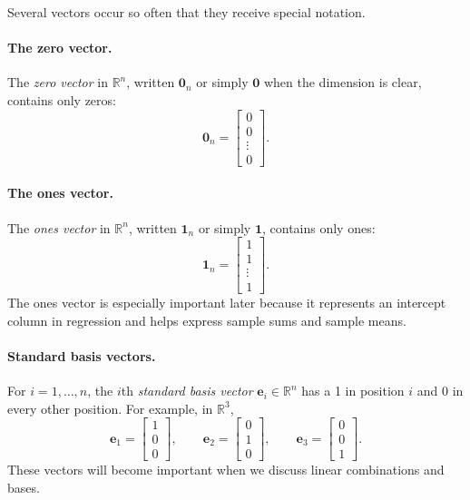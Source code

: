 Several vectors occur so often that they receive special notation.

\paragraph{The zero vector.}
\label{mf:zero-vector}
The \emph{zero vector} in \(\mathbb{R}^n\), written \(\mathbf{0}_n\) or simply \(\mathbf{0}\) when the dimension is clear, contains only zeros:
\[
\mathbf{0}_n=
\begin{bmatrix}
0\\0\\\vdots\\0
\end{bmatrix}.
\]

\paragraph{The ones vector.}
\label{mf:ones-vector}
The \emph{ones vector} in \(\mathbb{R}^n\), written \(\mathbf{1}_n\) or simply \(\mathbf{1}\), contains only ones:
\[
\mathbf{1}_n=
\begin{bmatrix}
1\\1\\\vdots\\1
\end{bmatrix}.
\]
The ones vector is especially important later because it represents an intercept column in regression and helps express sample sums and sample means.

\paragraph{Standard basis vectors.}
\label{mf:standard-basis-vectors}
For \(i=1,\ldots,n\), the \(i\)th \emph{standard basis vector} \(\mathbf{e}_i\in\mathbb{R}^n\) has a 1 in position \(i\) and 0 in every other position. For example, in \(\mathbb{R}^3\),
\[
\mathbf{e}_1=\begin{bmatrix}1\\0\\0\end{bmatrix},
\qquad
\mathbf{e}_2=\begin{bmatrix}0\\1\\0\end{bmatrix},
\qquad
\mathbf{e}_3=\begin{bmatrix}0\\0\\1\end{bmatrix}.
\]
These vectors will become important when we discuss linear combinations and bases.


